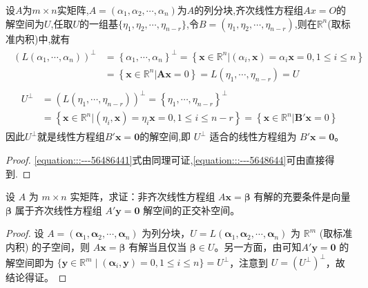 \documentclass[../../main.tex]{subfiles}%
\begin{document}
\begin{corollary}\label{corollary:齐次方程的解空间是其系数矩阵的正交补空间}
设$A$为$m\times n$实矩阵,$A=(\alpha_1,\alpha_2,\cdots,\alpha_n)$为$A$的列分块,齐次线性方程组$Ax=O$的解空间为$U$,任取$U$的一组基$\{\eta_1,\eta_2,\cdots,\eta_{n-r}\}$,令$B=(\eta_1,\eta_2,\cdots,\eta_{n-r})$,则在$\mathbb{R}^n$(取标准内积)中,就有
\begin{align}\label{equation:::---56486441}
\begin{aligned}
\left( L\left( \alpha _1,\cdots ,\alpha _n \right) \right) ^{\bot}&=\left\{ \alpha _1,\cdots ,\alpha _n \right\} ^{\bot}=\left\{ \boldsymbol{x}\in \mathbb{R} ^n|\left( \alpha _i,\boldsymbol{x} \right) =\alpha _i\boldsymbol{x}=0,1\leqslant i\leqslant n \right\} 
\\
&=\left\{ \boldsymbol{x}\in \mathbb{R} ^n|\boldsymbol{Ax}=0 \right\} =L\left( \eta _1,\cdots ,\eta _{n-r} \right) =U
\end{aligned}
\end{align}
\begin{align}\label{equation:::---5648644}
\begin{aligned}
U^{\bot}&=\left( L\left( \eta _1,\cdots ,\eta _{n-r} \right) \right) ^{\bot}=\left\{ \eta _1,\cdots ,\eta _{n-r} \right\} ^{\bot}
\\
&=\left\{ \boldsymbol{x}\in \mathbb{R} ^n|\left( \eta _i,\boldsymbol{x} \right) =\eta _i\boldsymbol{x}=0,1\leqslant i\leqslant n-r \right\} =\left\{ \boldsymbol{x}\in \mathbb{R} ^n|\boldsymbol{B}'\boldsymbol{x}=0 \right\} 
\end{aligned}
\end{align}
因此$U^{\perp}$就是线性方程组$B'\boldsymbol{x} = \boldsymbol{0}$的解空间,即 $U^{\perp}$ 适合的线性方程组为 $B'\boldsymbol{x} = \boldsymbol{0}$。
\end{corollary}
\begin{proof}
\eqref{equation:::---56486441}式由同理可证,\eqref{equation:::---5648644}可由直接得到.
\end{proof}

\begin{proposition}\label{proposition:例9.21}
设 $A$ 为 $m \times n$ 实矩阵，求证：非齐次线性方程组 $A\boldsymbol{x} = \boldsymbol{\beta}$ 有解的充要条件是向量 $\boldsymbol{\beta}$ 属于齐次线性方程组 $A'\boldsymbol{y} = \boldsymbol{0}$ 解空间的正交补空间。
\end{proposition}
\begin{proof}
设 $A = (\boldsymbol{\alpha}_1, \boldsymbol{\alpha}_2, \cdots, \boldsymbol{\alpha}_n)$ 为列分块，$U = L(\boldsymbol{\alpha}_1, \boldsymbol{\alpha}_2, \cdots, \boldsymbol{\alpha}_n)$ 为 $\mathbb{R}^m$ (取标准内积) 的子空间，则 $A\boldsymbol{x} = \boldsymbol{\beta}$ 有解当且仅当 $\boldsymbol{\beta} \in U$。另一方面，由可知$A'\boldsymbol{y} = \boldsymbol{0}$ 的解空间即为 $\{\boldsymbol{y} \in \mathbb{R}^m \mid (\boldsymbol{\alpha}_i, \boldsymbol{y}) = 0, 1 \leqslant  i \leqslant  n\} = U^{\perp}$，注意到 $U = (U^{\perp})^{\perp}$，故结论得证。
\end{proof}
\end{document}
